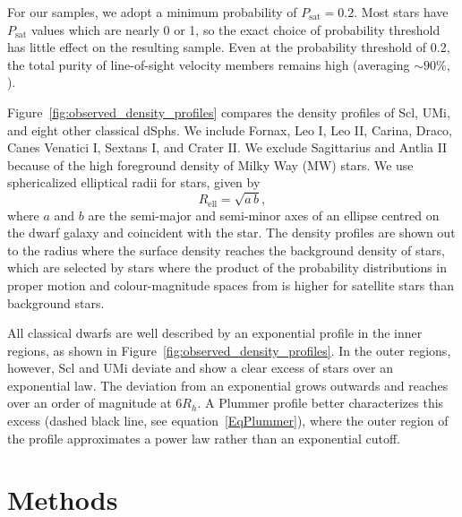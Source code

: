\documentclass[linenumbers, twocolumn, twocolappendix]{aastex701}
\newcommand{\jj}{\citetalias{jensen+2024}}
\begin{document}
For our samples, we adopt a minimum probability of
$P_\text{sat} = 0.2$. Most stars have $P_\text{sat}$ values which are nearly 0 or 1, so the exact choice of probability threshold has little effect on the resulting sample. Even
at the probability threshold of 0.2, the total purity of line-of-sight velocity members remains
high (averaging ${\sim}90\%$, \jj{}).

Figure~\ref{fig:observed_density_profiles} compares the density profiles of Scl, UMi, and eight other classical dSphs. 
We include Fornax, Leo I, Leo II, Carina, Draco, Canes Venatici I, Sextans I, and Crater II. 
We exclude Sagittarius and Antlia II because of the high foreground density of Milky Way (MW) stars.
We use sphericalized elliptical radii for stars, given by
\begin{equation} \label{eq:r_ell}
    R_\text{ell} = \sqrt{a\,b},
\end{equation}
where $a$ and $b$ are the semi-major and semi-minor axes of an ellipse centred on the dwarf galaxy and coincident with the star.
The density profiles are shown out to the radius where the surface density reaches the background density of stars, which are selected by stars where the product of the probability distributions in proper motion and colour-magnitude spaces from \jj{} is higher for satellite stars than background stars. 

All classical dwarfs are well described by an exponential profile in the inner regions, as shown in Figure~\ref{fig:observed_density_profiles}.
In the outer regions, however, Scl and UMi deviate and show a clear  excess of stars over an exponential law. The deviation from an exponential grows outwards and  reaches over an order of magnitude at $6 R_h$. A Plummer profile better characterizes this excess (dashed black line, see equation~\ref{EqPlummer}), where the outer region of the profile approximates a power law rather than an exponential cutoff. 




\section{Methods} \label{sec:methods}
\end{document}
